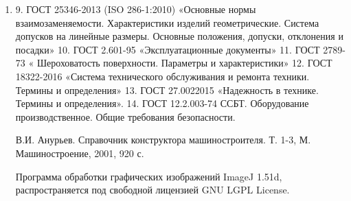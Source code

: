 \begin{enumerate}
	
\item 	    9. ГОСТ 25346-2013 (ISO 286-1:2010) «Основные нормы взаимозаменяемости. Характеристики изделий геометрические. Система допусков на линейные размеры. Основные положения, допуски, отклонения и посадки»
	10. ГОСТ 2.601-95 «Эксплуатационные документы»
	11. ГОСТ 2789-73 « Шероховатость поверхности. Параметры и характеристики»
	12. ГОСТ 18322-2016 «Система технического обслуживания и ремонта техники. Термины и определения»
	13. ГОСТ 27.002­2015 «Надежность в технике. Термины и   определения». 
	14. ГОСТ 12.2.003-74 ССБТ. Оборудование производственное. Общие требования безопасности.
	  
	  В.И. Анурьев. Справочник конструктора машиностроителя. Т. 1-3,  М. Машиностроение, 2001, 920 с.
	  
	  Программа обработки графических изображений ImageJ 1.51d,  распространяется под свободной лицензией GNU LGPL License.
	

\end{enumerate}
